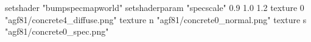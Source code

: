 setshader "bumpspecmapworld"
setshaderparam "specscale" 0.9 1.0 1.2
    texture 0 "agf81/concrete4_diffuse.png"
    texture n "agf81/concrete0_normal.png"
    texture s "agf81/concrete0_spec.png"